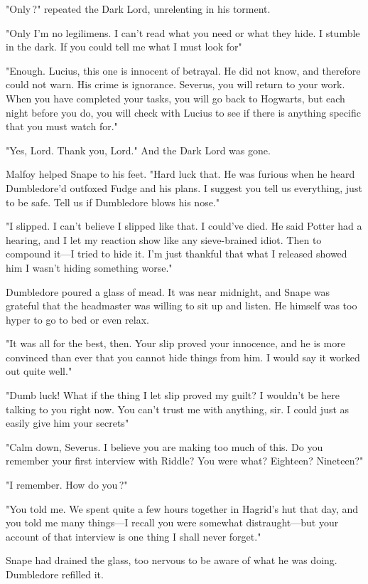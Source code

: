 "Only{\el}\,?" repeated the Dark Lord, unrelenting in his torment.

"Only I'm no legilimens. I can't read what you need or what they hide. I stumble in the dark. If you could tell me what I must look for{\el}"

"Enough. Lucius, this one is innocent of betrayal. He did not know, and therefore could not warn. His crime is ignorance. Severus, you will return to your work. When you have completed your tasks, you will go back to Hogwarts, but each night before you do, you will check with Lucius to see if there is anything specific that you must watch for."

"Yes, Lord. Thank you, Lord." And the Dark Lord was gone.

Malfoy helped Snape to his feet. "Hard luck that. He was furious when he heard Dumbledore'd outfoxed Fudge and his plans. I suggest you tell us everything, just to be safe. Tell us if Dumbledore blows his nose."

\sbreak

"I slipped. I can't believe I slipped like that. I could've died. He said Potter had a hearing, and I let my reaction show like any sieve-brained idiot. Then to compound it—I tried to hide it. I'm just thankful that what I released showed him I wasn't hiding something worse."

Dumbledore poured a glass of mead. It was near midnight, and Snape was grateful that the headmaster was willing to sit up and listen. He himself was too hyper to go to bed or even relax.

"It was all for the best, then. Your slip proved your innocence, and he is more convinced than ever that you cannot hide things from him. I would say it worked out quite well."

"Dumb luck! What if the thing I let slip proved my guilt? I wouldn't be here talking to you right now. You can't trust me with anything, sir. I could just as easily give him your secrets{\el}"

"Calm down, Severus. I believe you are making too much of this. Do you remember your first interview with Riddle? You were what? Eighteen? Nineteen?"

"I remember. How do you{\el}\,?"

"You told me. We spent quite a few hours together in Hagrid's hut that day, and you told me many things—I recall you were somewhat distraught—but your account of that interview is one thing I shall never forget."

Snape had drained the glass, too nervous to be aware of what he was doing. Dumbledore refilled it.

